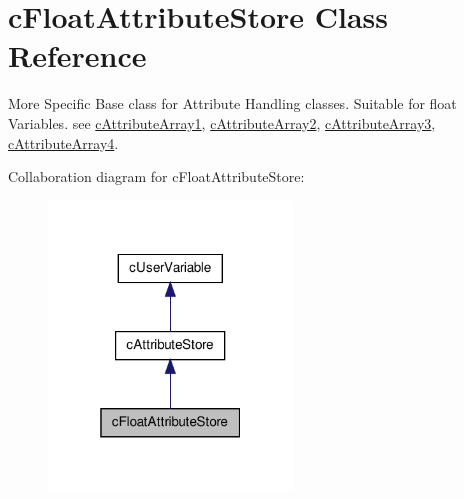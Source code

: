 \hypertarget{classc_float_attribute_store}{
\section{cFloatAttributeStore Class Reference}
\label{classc_float_attribute_store}
}


More Specific Base class for Attribute Handling classes. Suitable for float Variables. see \hyperlink{classc_attribute_array1}{cAttributeArray1}, \hyperlink{classc_attribute_array2}{cAttributeArray2}, \hyperlink{classc_attribute_array3}{cAttributeArray3}, \hyperlink{classc_attribute_array4}{cAttributeArray4}.  




Collaboration diagram for cFloatAttributeStore:\nopagebreak
\begin{figure}[H]
\begin{center}
\leavevmode
\includegraphics[width=184pt]{classc_float_attribute_store__coll__graph}
\end{center}
\end{figure}
